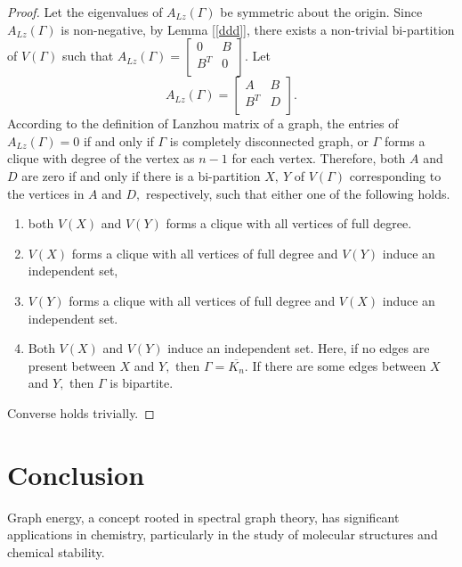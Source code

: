 \documentclass[10pt,a4paper,oneside]{article}
\begin{document}
\begin{proof}
	Let the eigenvalues of $A_{Lz}(\Gamma)$ be symmetric about the origin. Since $A_{Lz}(\Gamma)$ is non-negative, by Lemma [\ref{ddd}], there exists a non-trivial bi-partition of $V(\Gamma)$  such that $A_{Lz}(\Gamma)=\begin{bmatrix}
		0 & B\\
		B^T & 0\\
	\end{bmatrix}.$ 
	Let \begin{equation} A_{Lz}(\Gamma)= \label{matrix}
		\begin{bmatrix}
			A & B\\
			B^T & D\\
\end{bmatrix}.
\end{equation}
According to the definition of Lanzhou matrix of a graph, the entries of $A_{Lz}(\Gamma)=0$ if and only if $\Gamma$ is completely disconnected graph, or $\Gamma$ forms a clique with degree of the vertex as $n-1$ for each vertex.
Therefore, both $A$ and $D$ are zero if and only if there is a bi-partition $X,\ Y$ of $V(\Gamma)$ corresponding to the vertices in $A$ and $D,$ respectively, such that either one of the following holds.
\begin{enumerate}
\item both $V(X)$ and $V(Y)$ forms a clique with all vertices of full degree. 
\item $V(X)$ forms a clique with all vertices of full degree and $V(Y)$ induce an independent set,
\item $V(Y)$ forms a clique with all vertices of full degree and $V(X)$ induce an independent set.
\item  Both $V(X)$ and $V(Y)$ induce an independent set. Here, if no edges are present between $X$ and $Y,$ then $\Gamma=\overline{K_n}.$ If there are some edges between $X$ and $Y,$ then $\Gamma$ is bipartite.
\end{enumerate}
Converse holds trivially.
\end{proof}

\section{Conclusion}

Graph energy, a concept rooted in spectral graph theory, has significant applications in chemistry, particularly in the study of molecular structures and chemical stability.
\end{document}
